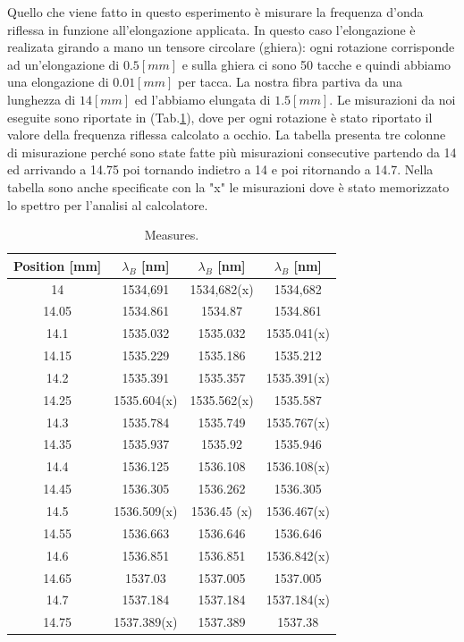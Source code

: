 Quello che viene fatto in questo esperimento è misurare la frequenza d'onda riflessa in funzione all'elongazione applicata. In questo caso l'elongazione è realizata girando a mano un tensore circolare (ghiera): ogni rotazione corrisponde ad un'elongazione di $0.5[mm]$ e sulla ghiera ci sono 50 tacche e quindi abbiamo una elongazione di $0.01[mm]$ per tacca. La nostra fibra partiva da una lunghezza di $14[mm]$ ed l'abbiamo elungata di $1.5[mm]$. Le misurazioni da noi eseguite sono riportate in (Tab.\ref{table:measures}), dove per ogni rotazione è stato riportato il valore della frequenza riflessa calcolato a occhio. La tabella presenta tre colonne di misurazione perché sono state fatte più misurazioni consecutive partendo da 14 ed arrivando a 14.75 poi tornando indietro a 14 e poi ritornando a 14.7. Nella tabella sono anche specificate con la "x" le misurazioni dove è stato memorizzato lo spettro per l'analisi al calcolatore.
\begin{table}[h]
  \begin{tabular}{c|c|c|c}
      Position [mm]  &  $\lambda_B$  [nm]  &  $\lambda_B$  [nm]  &  $\lambda_B$  [nm]  \\
      \hline
      14     &  1534,691     &  1534,682(x)  &  1534,682     \\
      14.05  &  1534.861     &  1534.87      &  1534.861     \\
      14.1   &  1535.032     &  1535.032     &  1535.041(x)  \\
      14.15  &  1535.229     &  1535.186     &  1535.212     \\
      14.2   &  1535.391     &  1535.357     &  1535.391(x)  \\
      14.25  &  1535.604(x)  &  1535.562(x)  &  1535.587     \\
      14.3   &  1535.784     &  1535.749     &  1535.767(x)  \\
      14.35  &  1535.937     &  1535.92      &  1535.946     \\
      14.4   &  1536.125     &  1536.108     &  1536.108(x)  \\
      14.45  &  1536.305     &  1536.262     &  1536.305     \\
      14.5   &  1536.509(x)  &  1536.45 (x)  &  1536.467(x)  \\
      14.55  &  1536.663     &  1536.646     &  1536.646     \\
      14.6   &  1536.851     &  1536.851     &  1536.842(x)  \\
      14.65  &  1537.03      &  1537.005     &  1537.005     \\
      14.7   &  1537.184     &  1537.184     &  1537.184(x)  \\
      14.75  &  1537.389(x)  &  1537.389     &  1537.38      \\

  \end{tabular}
  \caption{Measures.}
  \label{table:measures}
\end{table}



